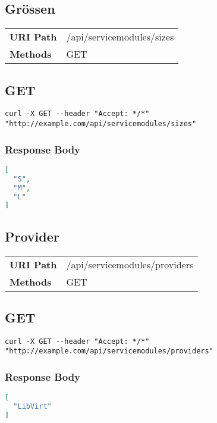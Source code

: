 \subsection{Grössen}
\begin{tabularx}{\linewidth}{l l}
\textbf{URI Path} & /api/servicemodules/sizes\\
\textbf{Methods} & GET\\
\end{tabularx}
\subsection{GET}
\begin{lstlisting}[] 
curl -X GET --header "Accept: */*" "http://example.com/api/servicemodules/sizes"
\end{lstlisting}

\subsubsection{Response Body}
\begin{lstlisting}[language=json] 
[
  "S",
  "M",
  "L"
]
\end{lstlisting}


\subsection{Provider}
\begin{tabularx}{\linewidth}{l l}
\textbf{URI Path} & /api/servicemodules/providers\\
\textbf{Methods} & GET\\
\end{tabularx}
\subsection{GET}
\begin{lstlisting}[] 
curl -X GET --header "Accept: */*" "http://example.com/api/servicemodules/providers"
\end{lstlisting}

\subsubsection{Response Body}
\begin{lstlisting}[language=json] 
[
  "LibVirt"
]
\end{lstlisting}


\newpage





